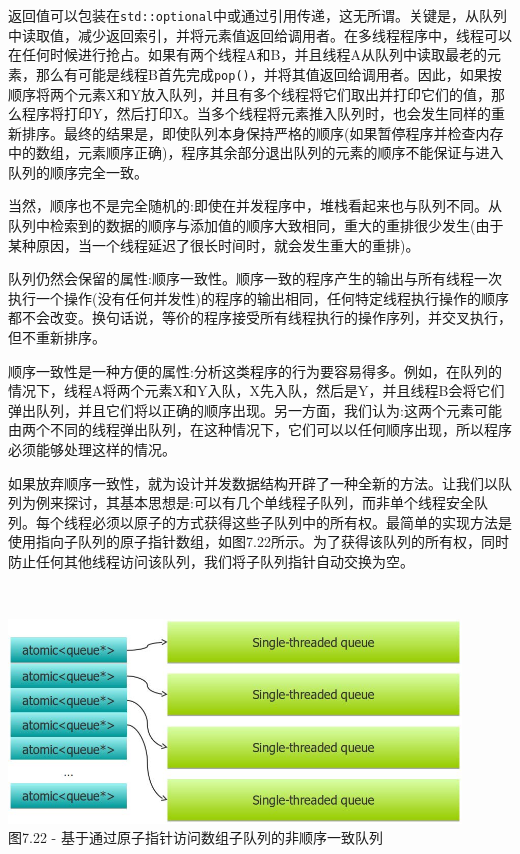 返回值可以包装在\texttt{std::optional}中或通过引用传递，这无所谓。关键是，从队列中读取值，减少返回索引，并将元素值返回给调用者。在多线程程序中，线程可以在任何时候进行抢占。如果有两个线程A和B，并且线程A从队列中读取最老的元素，那么有可能是线程B首先完成\texttt{pop()}，并将其值返回给调用者。因此，如果按顺序将两个元素X和Y放入队列，并且有多个线程将它们取出并打印它们的值，那么程序将打印Y，然后打印X。当多个线程将元素推入队列时，也会发生同样的重新排序。最终的结果是，即使队列本身保持严格的顺序(如果暂停程序并检查内存中的数组，元素顺序正确)，程序其余部分退出队列的元素的顺序不能保证与进入队列的顺序完全一致。

当然，顺序也不是完全随机的:即使在并发程序中，堆栈看起来也与队列不同。从队列中检索到的数据的顺序与添加值的顺序大致相同，重大的重排很少发生(由于某种原因，当一个线程延迟了很长时间时，就会发生重大的重排)。

队列仍然会保留的属性:顺序一致性。顺序一致的程序产生的输出与所有线程一次执行一个操作(没有任何并发性)的程序的输出相同，任何特定线程执行操作的顺序都不会改变。换句话说，等价的程序接受所有线程执行的操作序列，并交叉执行，但不重新排序。

顺序一致性是一种方便的属性:分析这类程序的行为要容易得多。例如，在队列的情况下，线程A将两个元素X和Y入队，X先入队，然后是Y，并且线程B会将它们弹出队列，并且它们将以正确的顺序出现。另一方面，我们认为:这两个元素可能由两个不同的线程弹出队列，在这种情况下，它们可以以任何顺序出现，所以程序必须能够处理这样的情况。

如果放弃顺序一致性，就为设计并发数据结构开辟了一种全新的方法。让我们以队列为例来探讨，其基本思想是:可以有几个单线程子队列，而非单个线程安全队列。每个线程必须以原子的方式获得这些子队列中的所有权。最简单的实现方法是使用指向子队列的原子指针数组，如图7.22所示。为了获得该队列的所有权，同时防止任何其他线程访问该队列，我们将子队列指针自动交换为空。

\hspace*{\fill} \\ %
\begin{center}
\includegraphics[width=0.9\textwidth]{content/2/chapter7/images/22.jpg}\\
图7.22 - 基于通过原子指针访问数组子队列的非顺序一致队列
\end{center}

